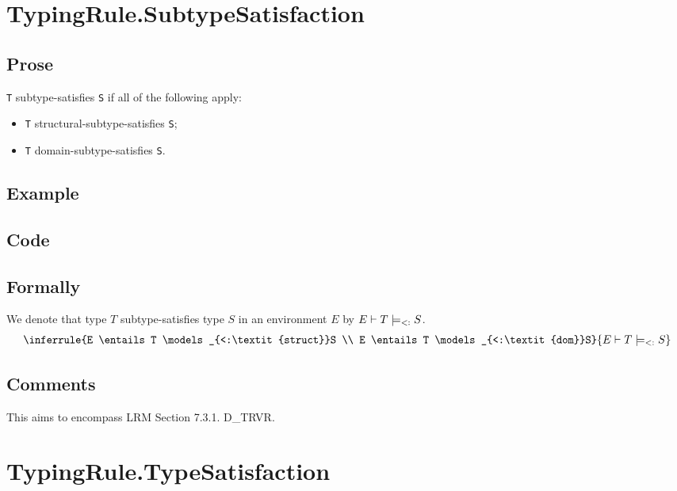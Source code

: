 \documentclass{book}
\newcommand\structsubtypesat[0]{\models_{<:\textit{struct}}}
\newcommand\domsubtypesat[0]{\models_{<:\textit{dom}}}
\newcommand\subtypesat[0]{\models_{<:}}
\begin{document}
\section{TypingRule.SubtypeSatisfaction}

  \subsection{Prose}
    \texttt{T} subtype-satisfies \texttt{S} if all of the following apply:
    \begin{itemize}
    \item \texttt{T} structural-subtype-satisfies \texttt{S};
    \item \texttt{T} domain-subtype-satisfies \texttt{S}.
    \end{itemize}

  \subsection{Example}

  \subsection{Code}

\begin{emptyformal}
    \subsection{Formally}
We denote that type $T$ subtype-satisfies type $S$ in an environment $E$ by $E \entails T \subtypesat S$.
\[
\begin{array}{c}
\inferrule{E \entails T \structsubtypesat S \\ E \entails T \domsubtypesat S}
{E \entails T \subtypesat S}
\end{array}
\]
\end{emptyformal}

\subsection{Comments}
    This aims to encompass LRM Section 7.3.1. D\_TRVR.

\section{TypingRule.TypeSatisfaction \label{sec:TypingRule.TypeSatisfaction}}
\end{document}
